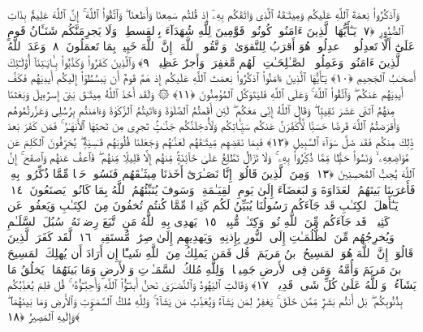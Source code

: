  وَٱذكُرُوا۟ نِعمَةَ ٱللَّهِ عَلَيكُم وَمِيثَـٰقَهُ ٱلَّذِى وَاثَقَكُم بِهِۦٓ إِذ قُلتُم سَمِعنَا وَأَطَعنَا ۖ وَٱتَّقُوا۟ ٱللَّهَ ۚ إِنَّ ٱللَّهَ عَلِيمٌۢ بِذَاتِ ٱلصُّدُورِ ﴿٧﴾
 يَـٰٓأَيُّهَا ٱلَّذِينَ ءَامَنُوا۟ كُونُوا۟ قَوَّٰمِينَ لِلَّهِ شُهَدَآءَ بِٱلقِسطِ ۖ وَلَا يَجرِمَنَّكُم شَنَـَٔانُ قَومٍ عَلَىٰٓ أَلَّا تَعدِلُوا۟ ۚ ٱعدِلُوا۟ هُوَ أَقرَبُ لِلتَّقوَىٰ ۖ وَٱتَّقُوا۟ ٱللَّهَ ۚ إِنَّ ٱللَّهَ خَبِيرٌۢ بِمَا تَعمَلُونَ ﴿٨﴾
 وَعَدَ ٱللَّهُ ٱلَّذِينَ ءَامَنُوا۟ وَعَمِلُوا۟ ٱلصَّـٰلِحَـٰتِ ۙ لَهُم مَّغفِرَةٌۭ وَأَجرٌ عَظِيمٌۭ ﴿٩﴾
 وَٱلَّذِينَ كَفَرُوا۟ وَكَذَّبُوا۟ بِـَٔايَـٰتِنَآ أُو۟لَـٰٓئِكَ أَصحَـٰبُ ٱلجَحِيمِ ﴿١٠﴾
 يَـٰٓأَيُّهَا ٱلَّذِينَ ءَامَنُوا۟ ٱذكُرُوا۟ نِعمَتَ ٱللَّهِ عَلَيكُم إِذ هَمَّ قَومٌ أَن يَبسُطُوٓا۟ إِلَيكُم أَيدِيَهُم فَكَفَّ أَيدِيَهُم عَنكُم ۖ وَٱتَّقُوا۟ ٱللَّهَ ۚ وَعَلَى ٱللَّهِ فَليَتَوَكَّلِ ٱلمُؤمِنُونَ ﴿١١﴾
 ۞ وَلَقَد أَخَذَ ٱللَّهُ مِيثَـٰقَ بَنِىٓ إِسرَٰٓءِيلَ وَبَعَثنَا مِنهُمُ ٱثنَى عَشَرَ نَقِيبًۭا ۖ وَقَالَ ٱللَّهُ إِنِّى مَعَكُم ۖ لَئِن أَقَمتُمُ ٱلصَّلَوٰةَ وَءَاتَيتُمُ ٱلزَّكَوٰةَ وَءَامَنتُم بِرُسُلِى وَعَزَّرتُمُوهُم وَأَقرَضتُمُ ٱللَّهَ قَرضًا حَسَنًۭا لَّأُكَفِّرَنَّ عَنكُم سَيِّـَٔاتِكُم وَلَأُدخِلَنَّكُم جَنَّـٰتٍۢ تَجرِى مِن تَحتِهَا ٱلأَنهَـٰرُ ۚ فَمَن كَفَرَ بَعدَ ذَٟلِكَ مِنكُم فَقَد ضَلَّ سَوَآءَ ٱلسَّبِيلِ ﴿١٢﴾
 فَبِمَا نَقضِهِم مِّيثَـٰقَهُم لَعَنَّـٰهُم وَجَعَلنَا قُلُوبَهُم قَـٰسِيَةًۭ ۖ يُحَرِّفُونَ ٱلكَلِمَ عَن مَّوَاضِعِهِۦ ۙ وَنَسُوا۟ حَظًّۭا مِّمَّا ذُكِّرُوا۟ بِهِۦ ۚ وَلَا تَزَالُ تَطَّلِعُ عَلَىٰ خَآئِنَةٍۢ مِّنهُم إِلَّا قَلِيلًۭا مِّنهُم ۖ فَٱعفُ عَنهُم وَٱصفَح ۚ إِنَّ ٱللَّهَ يُحِبُّ ٱلمُحسِنِينَ ﴿١٣﴾
 وَمِنَ ٱلَّذِينَ قَالُوٓا۟ إِنَّا نَصَـٰرَىٰٓ أَخَذنَا مِيثَـٰقَهُم فَنَسُوا۟ حَظًّۭا مِّمَّا ذُكِّرُوا۟ بِهِۦ فَأَغرَينَا بَينَهُمُ ٱلعَدَاوَةَ وَٱلبَغضَآءَ إِلَىٰ يَومِ ٱلقِيَـٰمَةِ ۚ وَسَوفَ يُنَبِّئُهُمُ ٱللَّهُ بِمَا كَانُوا۟ يَصنَعُونَ ﴿١٤﴾
 يَـٰٓأَهلَ ٱلكِتَـٰبِ قَد جَآءَكُم رَسُولُنَا يُبَيِّنُ لَكُم كَثِيرًۭا مِّمَّا كُنتُم تُخفُونَ مِنَ ٱلكِتَـٰبِ وَيَعفُوا۟ عَن كَثِيرٍۢ ۚ قَد جَآءَكُم مِّنَ ٱللَّهِ نُورٌۭ وَكِتَـٰبٌۭ مُّبِينٌۭ ﴿١٥﴾
 يَهدِى بِهِ ٱللَّهُ مَنِ ٱتَّبَعَ رِضوَٟنَهُۥ سُبُلَ ٱلسَّلَـٰمِ وَيُخرِجُهُم مِّنَ ٱلظُّلُمَـٰتِ إِلَى ٱلنُّورِ بِإِذنِهِۦ وَيَهدِيهِم إِلَىٰ صِرَٰطٍۢ مُّستَقِيمٍۢ ﴿١٦﴾
 لَّقَد كَفَرَ ٱلَّذِينَ قَالُوٓا۟ إِنَّ ٱللَّهَ هُوَ ٱلمَسِيحُ ٱبنُ مَريَمَ ۚ قُل فَمَن يَملِكُ مِنَ ٱللَّهِ شَيـًٔا إِن أَرَادَ أَن يُهلِكَ ٱلمَسِيحَ ٱبنَ مَريَمَ وَأُمَّهُۥ وَمَن فِى ٱلأَرضِ جَمِيعًۭا ۗ وَلِلَّهِ مُلكُ ٱلسَّمَـٰوَٟتِ وَٱلأَرضِ وَمَا بَينَهُمَا ۚ يَخلُقُ مَا يَشَآءُ ۚ وَٱللَّهُ عَلَىٰ كُلِّ شَىءٍۢ قَدِيرٌۭ ﴿١٧﴾
 وَقَالَتِ ٱليَهُودُ وَٱلنَّصَـٰرَىٰ نَحنُ أَبنَـٰٓؤُا۟ ٱللَّهِ وَأَحِبَّـٰٓؤُهُۥ ۚ قُل فَلِمَ يُعَذِّبُكُم بِذُنُوبِكُم ۖ بَل أَنتُم بَشَرٌۭ مِّمَّن خَلَقَ ۚ يَغفِرُ لِمَن يَشَآءُ وَيُعَذِّبُ مَن يَشَآءُ ۚ وَلِلَّهِ مُلكُ ٱلسَّمَـٰوَٟتِ وَٱلأَرضِ وَمَا بَينَهُمَا ۖ وَإِلَيهِ ٱلمَصِيرُ ﴿١٨﴾
